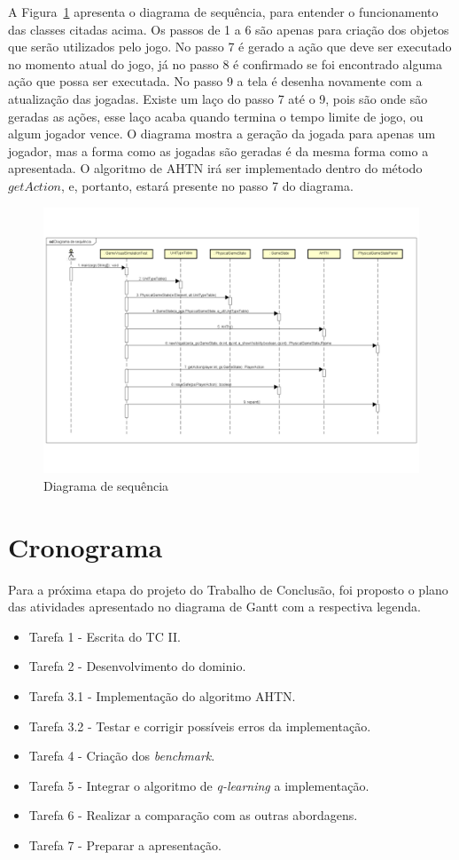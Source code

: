 A Figura~\ref{fig:sequencia} apresenta o diagrama de sequência, para entender o funcionamento das classes citadas acima. Os passos de 1 a 6 são apenas para criação dos objetos que serão utilizados pelo jogo. No passo 7 é gerado a ação que deve ser executado no momento atual do jogo, já no passo 8 é confirmado se foi encontrado alguma ação que possa ser executada. No passo 9 a tela é desenha novamente com a atualização das jogadas. Existe um laço do passo 7 até o 9, pois são onde são geradas as ações, esse laço acaba quando termina o tempo limite de jogo, ou algum jogador vence. O diagrama mostra a geração da jogada para apenas um jogador, mas a forma como as jogadas são geradas é da mesma forma como a apresentada. O algoritmo de AHTN irá ser implementado dentro do método $getAction$, e, portanto, estará presente no passo 7 do diagrama.

\begin{figure}[ht]
  	\centering
  	\includegraphics[width=1\textwidth]{fig/diagramaSequencia.pdf}
  	\caption{Diagrama de sequência}
  	\label{fig:sequencia}
\end{figure}


\section{Cronograma}

Para a próxima etapa do projeto do Trabalho de Conclusão, foi proposto o plano das atividades apresentado no diagrama de Gantt com a respectiva legenda.

\begin{itemize}
\item Tarefa 1 - Escrita do TC II.
\item Tarefa 2 - Desenvolvimento do dominio.
\item Tarefa 3.1 - Implementação do algoritmo AHTN.
\item Tarefa 3.2 - Testar e corrigir possíveis erros da implementação.
\item Tarefa 4 - Criação dos \textit{benchmark}.
\item Tarefa 5 - Integrar o algoritmo de \textit{q-learning} a implementação. 
\item Tarefa 6 - Realizar a comparação com as outras abordagens. 
\item Tarefa 7 - Preparar a apresentação. 
\end{itemize}

